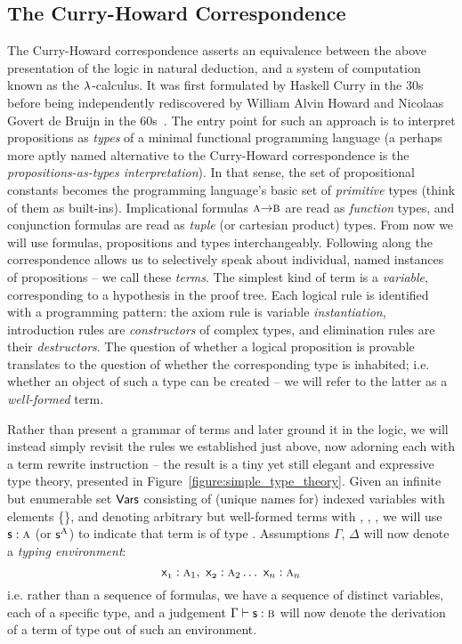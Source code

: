 \subsection{The Curry-Howard Correspondence}
The Curry-Howard correspondence asserts an equivalence between the above presentation of the logic in natural deduction, and a system of computation known as the $\mathnormal{\lambda}$-calculus.
It was first formulated by Haskell Curry in the 30s before being independently rediscovered by William Alvin Howard and Nicolaas Govert de Bruijn in the 60s~\cite{curry1934functionality,de1983automath,howard1980formulae}.
The entry point for such an approach is to interpret propositions as \textit{types} of a minimal functional programming language (a perhaps more aptly named alternative to the Curry-Howard correspondence is the \textit{propositions-as-types interpretation}).
In that sense, the set of propositional constants \propcon{} becomes the programming language's basic set of \textit{primitive} types (think of them as built-ins).
Implicational formulas $\smallprop{a} \ii \smallprop{b}$ are read as \textit{function} types, and conjunction formulas are read as \textit{tuple} (or cartesian product) types.
From now we will use formulas, propositions and types interchangeably.
Following along the correspondence allows us to selectively speak about individual, named instances of propositions -- we call these \textit{terms}.
The simplest kind of term is a \textit{variable}, corresponding to a hypothesis in the proof tree.
Each logical rule is identified with a programming pattern: the axiom rule is variable \textit{instantiation}, introduction rules are \textit{constructors} of complex types, and elimination rules are their \textit{destructors}.
The question of whether a logical proposition is provable translates to the question of whether the corresponding type is inhabited; i.e. whether an object of such a type can be created -- we will refer to the latter as a \textit{well-formed} term.

Rather than present a grammar of terms and later ground it in the logic, we will instead simply revisit the rules we established just above, now adorning each with a term rewrite instruction -- the result is a tiny yet still elegant and expressive type theory, presented in Figure~\ref{figure:simple_type_theory}.
Given an infinite but enumerable set $\mathsf{Vars}$ consisting of (unique names for) indexed variables with elements \{\term{\vari, \varj, \vark, \varl, \dots}\}, and denoting arbitrary but well-formed terms with , , , we will use $\mathsf{s}: \normalfont\textsc{a}$ (or $\mathsf{s}^{\normalfont\textsc{A}}$) to indicate that term  is of type .
Assumptions $\Gamma$, $\Delta$ will now denote a \textit{typing environment}:
\begin{equation}
\Var{1} : \prop a_1 ,~  \Var{2} : \prop a_2 \dots ~ \Var{n} : \prop a_n
\end{equation}
i.e. rather than a sequence of formulas, we have a sequence of distinct variables, each of a specific type, and a judgement $\Gamma \vdash \term{s} : \prop{b}$ will now denote the derivation of a term  of type  out of such an environment.

